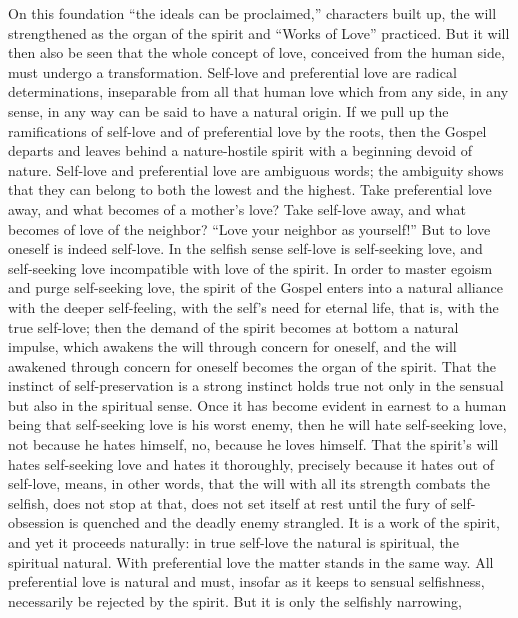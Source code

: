 \documentclass[12pt,a4paper,openany]{book}
\newcommand{\opage}[1]{\marginnote{\footnotesize\textit{[#1]}}}
\begin{document}
On this foundation ``the ideals can be proclaimed,''
characters built up, the will strengthened as the organ of the spirit
and ``Works of Love'' practiced. But it will then
also be seen that the whole concept of love, conceived from the
\setcounter{footnote}{0}%
\opage{513}human side, must undergo a transformation. Self-love
and preferential love are radical determinations,
inseparable from all that human love which
from any side, in any sense, in any way can be said
to have a natural origin. If we pull up the ramifications of self-love
and of preferential love by the roots, then the Gospel departs and leaves behind a nature-hostile
spirit with a beginning devoid of nature. Self-love
and preferential love are ambiguous words; the ambiguity shows
that they can belong to both the lowest and the highest.
Take preferential love away, and what becomes of a mother's love?
Take self-love away, and what becomes
of love of the neighbor? ``Love your neighbor as
yourself!'' But to love oneself is indeed self-love. In the selfish
sense self-love is self-seeking love, and self-seeking love
incompatible with love of the spirit. In order to master
egoism and purge self-seeking love, the spirit of the Gospel
enters into a natural alliance with the deeper self-feeling,
with the self's need for eternal life, that is, with the
true self-love; then the demand of the spirit becomes at bottom
a natural impulse, which awakens the will through concern for oneself,
and the will awakened through concern for oneself becomes the
organ of the spirit. That the instinct of self-preservation is a strong
instinct holds true not only in the sensual but also in the
spiritual sense. Once it has become evident in earnest to a human being
that self-seeking love is his worst
enemy, then he will hate self-seeking love, not because he
hates himself, no, because he loves himself. That the spirit's will
hates self-seeking love and hates it thoroughly, precisely
because it hates out of self-love, means, in other words,
that the will with all its strength combats the selfish, does not
\setcounter{footnote}{0}%
\opage{514}stop at that, does not set itself at rest until the fury of self-obsession
is quenched and the deadly enemy strangled. It is a work of the
spirit, and yet it proceeds naturally: in true self-love
the natural is spiritual, the spiritual natural.
With preferential love the matter stands in the same
way. All preferential love is natural and must, insofar as
it keeps to sensual selfishness, necessarily be rejected
by the spirit. But it is only the selfishly narrowing,
\end{document}
